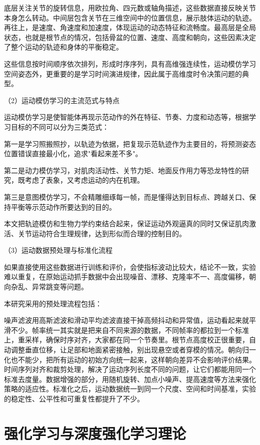 底层关注关节的旋转信息，用欧拉角、四元数或轴角描述，这些数据直接反映关节本身怎么转动。中间层包含关节在三维空间中的位置信息，展示肢体运动的轨迹。再往上，是速度、角速度和加速度，体现运动的动态特征和流畅度。最高层是全局状态，也就是根节点的情况，包括骨盆的位置、速度、高度和朝向，这些因素决定了整个运动的轨迹和身体的平衡稳定。

这些信息按时间顺序依次排列，形成时序序列，具有高维强连续性，运动模仿学习空间姿态外，更重要的是学习时间演进规律，因此属于高维度时令决策问题的典型。

（2）运动模仿学习的主流范式与特点

运动模仿学习是使智能体再现示范动作的外在特征、节奏、力度和动态等，根据学习目标的不同可以分为三类范式：

第一是学习照搬照抄，以轨迹为依据，把复现示范轨迹作为主要目的，将预测姿态位置错误直接最小化，追求"看起来差不多"。

第二是动力模仿学习，对肌肉活动性、关节力矩、地面反作用力等恐龙特性的研究，既考虑了表象，又考虑运动的内在机理。

第三是意图模仿学习，不会精雕细琢每一帧，而是懂得达到目标点、跨越关口、保持平衡等示范动作所要达到的目的。

本文把轨迹模仿和生物力学约束结合起来，保证运动外观逼真的同时又保证肌肉激活、关节运动符合生理规律，达到形似而合理的控制目的。

（3）运动数据预处理与标准化流程

如果直接使用这些数据进行训练和评价，会使指标波动比较大，结论不一致，实验难以重复，在原始运动抓手数据中会出现噪音、漂移、克隆率不一、高度偏移，朝向杂乱、异常跳变等问题。

本研究采用的预处理流程包括：

噪声滤波用高斯滤波和滑动平均滤波直接干掉高频抖动和异常值，运动看起来就平滑不少。帧率统一其实就是把来自不同来源的数据，不同帧率的都拉到一个标准上，重采样，确保时序对齐，大家都在同一个节奏里。根节点高度校正很重要，自动调整垂直位移，让足部和地面紧密接触，别出现悬空或者穿模的情况。朝向归一化也不能少，把所有运动的初始方向统一起来，这样朝向差异不会影响评价结果。时间序列对齐和裁剪处理，解决了运动序列长度不同的问题，让它们都能用同一个标准去度量。数据增强的部分，用随机旋转、加点小噪声、提高速度等方法来强化策略的适应性。标准化之后，运动数据统一到同一个尺度、空间和时间基准，实验的稳定性、公平性和可重复性都提升了不少。

\section{强化学习与深度强化学习理论}\label{ux5f3aux5316ux5b66ux4e60ux4e0eux6df1ux5ea6ux5f3aux5316ux5b66ux4e60ux7406ux8bba}

